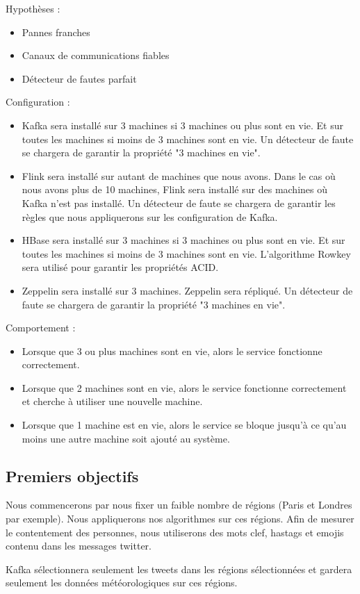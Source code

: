 \documentclass[a4paper,oneside,10pt]{article}
\begin{document}
Hypothèses : 
\begin{itemize}
	\item Pannes franches
	\item Canaux de communications fiables
	\item Détecteur de fautes parfait
\end{itemize}

Configuration : 
\begin{itemize}
	\item Kafka sera installé sur 3 machines si 3 machines ou plus sont en vie. Et sur toutes les machines si moins de 3 machines sont en vie. Un détecteur de faute se chargera de garantir la propriété "3 machines en vie".
	\item Flink sera installé sur autant de machines que nous avons. Dans le cas où nous avons plus de 10 machines, Flink sera installé sur des machines où Kafka n'est pas installé. Un détecteur de faute se chargera de garantir les règles que nous appliquerons sur les configuration de Kafka. 
	\item HBase sera installé sur 3 machines si 3 machines ou plus sont en vie. Et sur toutes les machines si moins de 3 machines sont en vie. L'algorithme Rowkey sera utilisé pour garantir les propriétés ACID.
	\item Zeppelin sera installé sur 3 machines. Zeppelin sera répliqué. Un détecteur de faute se chargera de garantir la propriété "3 machines en vie".
\end{itemize}

Comportement : 
\begin{itemize}
	\item Lorsque que 3 ou plus machines sont en vie, alors le service fonctionne correctement.
	\item Lorsque que 2 machines sont en vie, alors le service fonctionne correctement et cherche à utiliser une nouvelle machine.
	\item Lorsque que 1 machine est en vie, alors le service se bloque jusqu'à ce qu'au moins une autre machine soit ajouté au système. 
\end{itemize}


\subsection{Premiers objectifs}


Nous commencerons par nous fixer un faible nombre de régions (Paris et Londres par exemple). Nous appliquerons nos algorithmes sur ces régions. 
Afin de mesurer le contentement des personnes, nous utiliserons des mots clef, hastags et emojis contenu dans les messages twitter. 

Kafka sélectionnera seulement les tweets dans les régions sélectionnées et gardera seulement les données météorologiques sur ces régions. 
\end{document}
